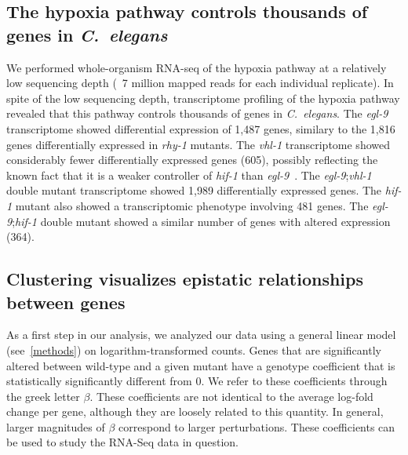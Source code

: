 \documentclass[9pt,twocolumn,twoside]{pnas-new}
\newcommand{\cel}{\emph{C.~elegans}}
\newcommand{\egl}{\emph{egl-9}}
\newcommand{\rhy}{\emph{rhy-1}}
\newcommand{\vhl}{\emph{vhl-1}}
\newcommand{\hif}{\emph{hif-1}}
\newcommand{\egln}{1,487}
\newcommand{\rhyn}{1,816}
\newcommand{\vhln}{605}
\newcommand{\eglvhln}{1,989}
\newcommand{\hifn}{481}
\newcommand{\eglhifn}{364}
\begin{document}
\subsection*{The hypoxia pathway controls thousands of genes in \cel{}}
\label{sub:summary}

We performed whole-organism RNA-seq of the hypoxia pathway at a relatively low
sequencing depth (~7 million mapped reads for each individual replicate). In spite
of the low sequencing depth,
transcriptome profiling of the hypoxia pathway revealed that this pathway controls
thousands of genes in \cel{}. The \egl{} transcriptome showed differential expression
of \egln{} genes, similary to the \rhyn{} genes differentially expressed in
\rhy{} mutants. The \vhl{} transcriptome showed considerably fewer differentially
expressed genes (\vhln{}), possibly reflecting the known fact that it is a weaker
controller of \hif{} than \egl{}~\cite{Shao2009}. The \egl{};\vhl{} double mutant
transcriptome showed \eglvhln{} differentially expressed genes. The \hif{}
mutant also showed a transcriptomic phenotype involving \hifn{} genes. The
\egl{};\hif{} double mutant showed a similar number of genes with altered expression
(\eglhifn{}).

\subsection*{Clustering visualizes epistatic relationships between genes}
\label{sub:Clustering}

As a first step in our analysis, we analyzed our data using a general
linear model (see~\ref{methods}) on logarithm-transformed
counts. Genes that are significantly altered between wild-type and a given
mutant have a genotype coefficient that is statistically significantly different
from 0. We refer to these coefficients through the greek letter $\beta$. These
coefficients are not identical to the average log-fold change per gene, although
they are loosely related to this quantity. In general, larger magnitudes of $\beta$
correspond to larger perturbations. These coefficients can be used to study the
RNA-Seq data in question.
\end{document}
